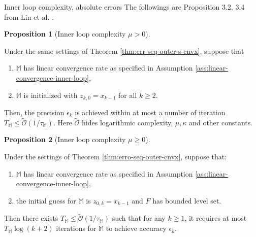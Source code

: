 \documentclass[11pt]{beamer}
\theoremstyle{definition}
\newtheorem{proposition}{Proposition}[section]
\begin{document}
        \begin{frame}{Inner loop complexity, absolute errors}
            The followings are Proposition 3.2, 3.4 from Lin et al. 
            \cite{lin_universal_2015}. 
            \begin{proposition}[Inner loop complexity $\mu > 0$]
            \label{prop:inner-loop-complexity-s-cnvx}
            {\footnotesize
                Under the same settings of Theorem \ref{thm:err-seq-outer-s-cnvx}, suppose that 
                \begin{enumerate}
                    \item $\mathbb M$ has linear convergence rate as specified in Assumption \ref{ass:linear-convergence-inner-loop}, 
                    \item $\mathbb M$ is initialized with  $z_{k, 0} = x_{k - 1}$ for all $k \ge 2$. 
                \end{enumerate}
                Then, the precision $\epsilon_k$ is achieved within at most a number of iteration $T_{\mathbb M} \le \widetilde {\mathcal O}(1/ \tau_{\mathbb M})$. 
                Here $\widetilde{\mathcal O}$ hides logarithmic complexity, $\mu, \kappa$ and other constants. 
            }
            \end{proposition}
            \begin{proposition}[Inner loop complexity $\mu \ge 0$]
            \label{prop:inner-loop-complexity-cnvx}
            {\footnotesize
                Under the settings of Theorem \ref{thm:erro-seq-outer-cnvx}, suppose that:
                \begin{enumerate}
                    \item $\mathbb M$ has linear convergence rate as specified in Assumption \ref{ass:linear-convergence-inner-loop}, 
                    \item the initial guess for $\mathbb M$ is $z_{0, k} = x_{k - 1}$ and $F$ has bounded level set.
                \end{enumerate}
                Then there exists $T_{\mathbb M} \le \widetilde{\mathcal O}(1 / \tau_{\mathbb M})$ such that for any $k \ge 1$, it requires at most\\ $T_{\mathbb M}\log(k + 2)$ iterations for $\mathbb M$ to achieve accuracy $\epsilon_k$.
            }
            \end{proposition}
        \end{frame}
\end{document}
